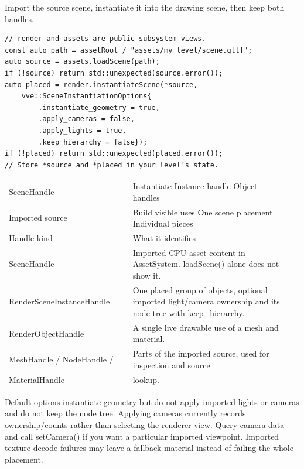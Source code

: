 \documentclass[11pt,a4paper]{article}
\begin{document}
\label{core-62}
Import the source scene, instantiate it into the drawing scene, then keep both handles.

\begin{lstlisting}[language={}]
// render and assets are public subsystem views.
const auto path = assetRoot / "assets/my_level/scene.gltf";
auto source = assets.loadScene(path);
if (!source) return std::unexpected(source.error());
auto placed = render.instantiateScene(*source,
    vve::SceneInstantiationOptions{
        .instantiate_geometry = true,
        .apply_cameras = false,
        .apply_lights = true,
        .keep_hierarchy = false});
if (!placed) return std::unexpected(placed.error());
// Store *source and *placed in your level's state.
\end{lstlisting}

{\small
\begin{longtable}{@{}p{0.42\linewidth}p{0.54\linewidth}@{}}
SceneHandle & Instantiate                  Instance handle                 Object handles \\
Imported source & Build visible uses           One scene placement              Individual pieces \\
Handle kind & What it identifies \\
SceneHandle & Imported CPU asset content in AssetSystem. loadScene() alone does not show it. \\
RenderSceneInstanceHandle & One placed group of objects, optional imported light/camera ownership and its node tree with keep\_hierarchy. \\
RenderObjectHandle & A single live drawable use of a mesh and material. \\
MeshHandle / NodeHandle / & Parts of the imported source, used for inspection and source \\
MaterialHandle & lookup. \\
\end{longtable}
}

Default options instantiate geometry but do not apply imported lights or cameras and do not keep the node tree. Applying cameras currently records ownership/counts rather than selecting the renderer view. Query camera data and call setCamera() if you want a particular imported viewpoint. Imported texture decode failures may leave a fallback material instead of failing the whole placement.
\end{document}
